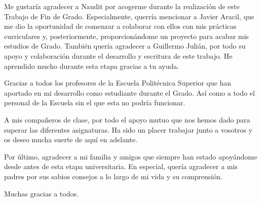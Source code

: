 Me gustaría agradecer a Naudit por acogerme durante la realización de este Trabajo de Fin de Grado. Especialmente, querría mencionar a Javier Aracil, que me dio la oportunidad de comenzar a colaborar con ellos con mis prácticas curriculares y, posteriormente, proporcionándome un proyecto para acabar mis estudios de Grado. También quería agradecer a Guillermo Julián, por todo su apoyo y colaboración durante el desarrollo y escritura de este trabajo. He aprendido mucho durante esta etapa gracias a tu ayuda.

Gracias a todos los profesores de la Escuela Politécnica Superior que han aportado en mi desarrollo como estudiante durante el Grado. Así como a todo el personal de la Escuela sin el que esta no podría funcionar.

A mis compañeros de clase, por todo el apoyo mutuo que nos hemos dado para superar las diferentes asignaturas. Ha sido un placer trabajar junto a vosotros y os deseo mucha suerte de aquí en adelante.

Por último, agradecer a mi familia y amigos que siempre han estado apoyándome desde antes de esta etapa universitaria. En especial, quería agradecer a mis padres por sus sabios consejos a lo largo de mi vida y su comprensión.

Muchas gracias a todos.